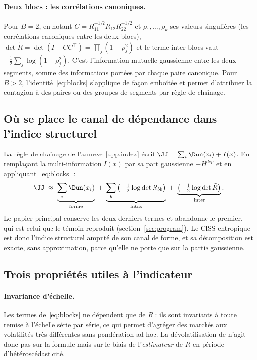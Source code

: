 \paragraph{Deux blocs : les corrélations canoniques.} Pour $B=2$, en notant
$C=R_{11}^{-1/2}R_{12}R_{22}^{-1/2}$ et $\rho_1,\dots,\rho_k$ ses valeurs
singulières (les corrélations canoniques entre les deux blocs),
$\det\tilde R=\det(I-CC^\top)=\prod_j(1-\rho_j^2)$ et le terme inter-blocs vaut
$-\tfrac12\sum_j\log(1-\rho_j^2)$. C'est l'information mutuelle gaussienne
entre les deux segments, somme des informations portées par chaque paire
canonique. Pour $B>2$, l'identité~\eqref{eq:blocks} s'applique de façon
emboîtée et permet d'attribuer la contagion à des paires ou des groupes de
segments par règle de chaînage.

\subsection{Où se place le canal de dépendance dans l'indice structurel}

La règle de chaînage de l'annexe~\ref{app:index} écrit
$\JJ=\sum_i\Dun(x_i)+I(x)$. En remplaçant la multi-information $I(x)$ par sa
part gaussienne $-H^{dep}$ et en appliquant~\eqref{eq:blocks} :
\begin{equation}
\label{eq:jblocks}
\JJ\;\approx\;\underbrace{\sum_i\Dun(x_i)}_{\text{forme}}
\;+\;\underbrace{\sum_b\left(-\tfrac12\log\det R_{bb}\right)}_{\text{intra}}
\;+\;\underbrace{\left(-\tfrac12\log\det\tilde R\right)}_{\text{inter}} .
\end{equation}
Le papier principal conserve les deux derniers termes et abandonne le premier,
qui est celui que le témoin reproduit (section~\ref{sec:program}). Le CISS
entropique est donc l'indice structurel amputé de son canal de forme, et sa
décomposition est exacte, sans approximation, parce qu'elle ne porte que sur la
partie gaussienne.

\subsection{Trois propriétés utiles à l'indicateur}

\paragraph{Invariance d'échelle.} Les termes de~\eqref{eq:blocks} ne dépendent
que de $R$ : ils sont invariants à toute remise à l'échelle série par série,
ce qui permet d'agréger des marchés aux volatilités très différentes sans
pondération ad hoc. La dévolatilisation de \citet{forbes2002} n'agit donc pas
sur la formule mais sur le biais de l'\emph{estimateur} de $R$ en période
d'hétéroscédasticité.

